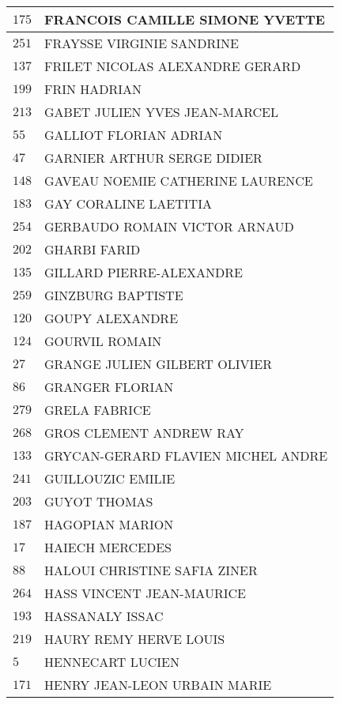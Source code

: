 \begin{xltabular}{\linewidth}{|l|X|}
    \hline
    $175$ & FRANCOIS CAMILLE SIMONE YVETTE \\
    \hline
    $251$ & FRAYSSE VIRGINIE SANDRINE \\
    \hline
    $137$ & FRILET NICOLAS ALEXANDRE GERARD \\
    \hline
    $199$ & FRIN HADRIAN \\
    \hline
    $213$ & GABET JULIEN YVES JEAN-MARCEL \\
    \hline
    $55$ & GALLIOT FLORIAN ADRIAN \\
    \hline
    $47$ & GARNIER ARTHUR SERGE DIDIER \\
    \hline
    $148$ & GAVEAU NOEMIE CATHERINE LAURENCE \\
    \hline
    $183$ & GAY CORALINE LAETITIA \\
    \hline
    $254$ & GERBAUDO ROMAIN VICTOR ARNAUD \\
    \hline
    $202$ & GHARBI FARID \\
    \hline
    $135$ & GILLARD PIERRE-ALEXANDRE \\
    \hline
    $259$ & GINZBURG BAPTISTE \\
    \hline
    $120$ & GOUPY ALEXANDRE \\
    \hline
    $124$ & GOURVIL ROMAIN \\
    \hline
    $27$ & GRANGE JULIEN GILBERT OLIVIER \\
    \hline
    $86$ & GRANGER FLORIAN \\
    \hline
    $279$ & GRELA FABRICE \\
    \hline
    $268$ & GROS CLEMENT ANDREW RAY \\
    \hline
    $133$ & GRYCAN-GERARD FLAVIEN MICHEL ANDRE \\
    \hline
    $241$ & GUILLOUZIC EMILIE \\
    \hline
    $203$ & GUYOT THOMAS \\
    \hline
    $187$ & HAGOPIAN MARION \\
    \hline
    $17$ & HAIECH MERCEDES \\
    \hline
    $88$ & HALOUI CHRISTINE SAFIA ZINER \\
    \hline
    $264$ & HASS VINCENT JEAN-MAURICE \\
    \hline
    $193$ & HASSANALY ISSAC \\
    \hline
    $219$ & HAURY REMY HERVE LOUIS \\
    \hline
    $5$ & HENNECART LUCIEN \\
    \hline
    $171$ & HENRY JEAN-LEON URBAIN MARIE \\

\end{xltabular}
